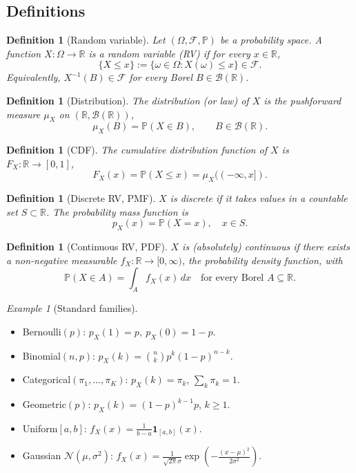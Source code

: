 \documentclass[11pt]{article}
\newtheorem{definition}[theorem]{Definition}
\theoremstyle{remark}
\newtheorem{example}[theorem]{Example}
\begin{document}
\subsection*{Definitions}

\begin{definition}[Random variable]
Let $(\Omega, \mathcal{F}, \mathbb{P})$ be a probability space. A function $X: \Omega \to \mathbb{R}$ is a \emph{random variable} (RV) if for every $x \in \mathbb{R}$,
\[
\{X \leq x\} := \{\omega \in \Omega : X(\omega) \leq x\} \in \mathcal{F}.
\]
Equivalently, $X^{-1}(B) \in \mathcal{F}$ for every Borel $B \in \mathcal{B}(\mathbb{R})$.
\end{definition}

\begin{definition}[Distribution]
The \emph{distribution} (or \emph{law}) of $X$ is the pushforward measure $\mu_X$ on $(\mathbb{R}, \mathcal{B}(\mathbb{R}))$,
\[
\mu_X(B) = \mathbb{P}(X \in B), \qquad B \in \mathcal{B}(\mathbb{R}).
\]
\end{definition}

\begin{definition}[CDF]
The \emph{cumulative distribution function} of $X$ is $F_X : \mathbb{R} \to [0,1]$,
\[
F_X(x) = \mathbb{P}(X \leq x) = \mu_X((-\infty, x]).
\]
\end{definition}

\begin{definition}[Discrete RV, PMF]
$X$ is \emph{discrete} if it takes values in a countable set $S \subset \mathbb{R}$. The \emph{probability mass function} is
\[
p_X(x) = \mathbb{P}(X = x), \quad x \in S.
\]
\end{definition}

\begin{definition}[Continuous RV, PDF]
$X$ is \emph{(absolutely) continuous} if there exists a non-negative measurable $f_X : \mathbb{R} \to [0,\infty)$, the \emph{probability density function}, with
\[
\mathbb{P}(X \in A) = \int_A f_X(x)\,dx \quad \text{for every Borel } A \subseteq \mathbb{R}.
\]
\end{definition}

\begin{example}[Standard families]
\begin{itemize}
\item Bernoulli$(p)$: $p_X(1)=p,\ p_X(0)=1-p$.
\item Binomial$(n,p)$: $p_X(k) = \binom{n}{k} p^k (1-p)^{n-k}$.
\item Categorical$(\pi_1,\dots,\pi_K)$: $p_X(k)=\pi_k$, $\sum_k \pi_k = 1$.
\item Geometric$(p)$: $p_X(k) = (1-p)^{k-1} p$, $k \geq 1$.
\item Uniform$[a,b]$: $f_X(x) = \tfrac{1}{b-a}\mathbf{1}_{[a,b]}(x)$.
\item Gaussian $\mathcal{N}(\mu,\sigma^2)$: $f_X(x) = \tfrac{1}{\sqrt{2\pi}\sigma} \exp\!\left(-\tfrac{(x-\mu)^2}{2\sigma^2}\right)$.
\end{itemize}
\end{example}
\end{document}
